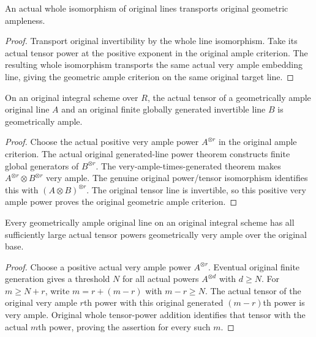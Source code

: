 \begin{lemma}
\label{lem:fc-original-ample-line-isomorphisms}
\leanok
{}
An actual whole isomorphism of original lines transports original
geometric ampleness.
\end{lemma}
\begin{proof}
Transport original invertibility by the whole line isomorphism. Take
its actual tensor power at the positive exponent in the original ample
criterion. The resulting whole isomorphism transports the same actual
very ample embedding line, giving the geometric ample criterion on the
same original target line.
\end{proof}

\begin{theorem}
\label{thm:fc-original-ample-tensor-generated}
\leanok
{}
On an original integral scheme over $R$, the actual tensor of a
geometrically ample original line $A$ and an original finite globally
generated invertible line $B$ is geometrically ample.
\end{theorem}
\begin{proof}
Choose the actual positive very ample power $A^{\otimes r}$ in the
original ample criterion. The actual original generated-line power
theorem constructs finite global generators of $B^{\otimes r}$. The
very-ample-times-generated theorem makes
$A^{\otimes r}\otimes B^{\otimes r}$ very ample. The genuine original
power/tensor isomorphism identifies this with $(A\otimes B)^{\otimes r}$.
The original tensor line is invertible, so this positive very ample
power proves the original geometric ample criterion.
\end{proof}

\begin{lemma}
\label{lem:fc-original-ample-eventual-very-ample}
\leanok
{}
Every geometrically ample original line on an original integral scheme
has all sufficiently large actual tensor powers geometrically very
ample over the original base.
\end{lemma}
\begin{proof}
Choose a positive actual very ample power $A^{\otimes r}$. Eventual
original finite generation gives a threshold $N$ for all actual powers
$A^{\otimes d}$ with $d\geq N$. For $m\geq N+r$, write
$m=r+(m-r)$ with $m-r\geq N$. The actual tensor of the original very
ample $r$th power with this original generated $(m-r)$th power is very
ample. Original whole tensor-power addition identifies that tensor
with the actual $m$th power, proving the assertion for every such $m$.
\end{proof}

